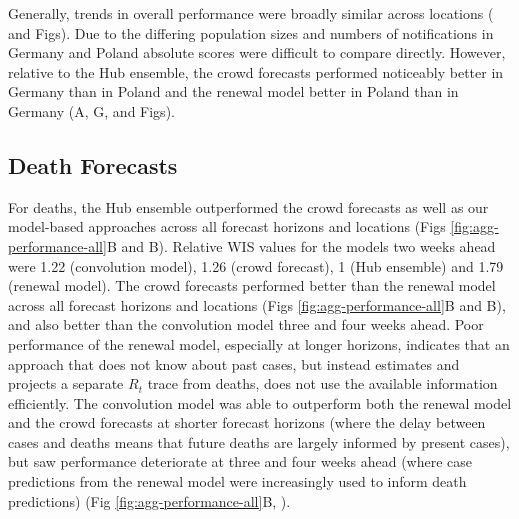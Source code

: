 \documentclass[10pt,letterpaper]{article}
\begin{document}
Generally, trends in overall performance were broadly similar across
locations ( and
 Figs). Due to the differing
population sizes and numbers of notifications in Germany and Poland
absolute scores were difficult to compare directly. However, relative to
the Hub ensemble, the crowd forecasts performed noticeably better in
Germany than in Poland and the renewal model better in Poland than in
Germany (A,
G,
 and
 Figs).

\hypertarget{death-forecasts}{%
\subsection{Death Forecasts}\label{death-forecasts}}

For deaths, the Hub ensemble outperformed the crowd forecasts as well as
our model-based approaches across all forecast horizons and locations
(Figs \ref{fig:agg-performance-all}B and
B). Relative WIS values for the
models two weeks ahead were 1.22 (convolution model), 1.26 (crowd
forecast), 1 (Hub ensemble) and 1.79 (renewal model). The crowd
forecasts performed better than the renewal model across all forecast
horizons and locations (Figs \ref{fig:agg-performance-all}B and
B), and also better than the
convolution model three and four weeks ahead. Poor performance of the
renewal model, especially at longer horizons, indicates that an approach
that does not know about past cases, but instead estimates and projects
a separate \(R_t\) trace from deaths, does not use the available
information efficiently. The convolution model was able to outperform
both the renewal model and the crowd forecasts at shorter forecast
horizons (where the delay between cases and deaths means that future
deaths are largely informed by present cases), but saw performance
deteriorate at three and four weeks ahead (where case predictions from
the renewal model were increasingly used to inform death predictions)
(Fig \ref{fig:agg-performance-all}B, ).
\end{document}
